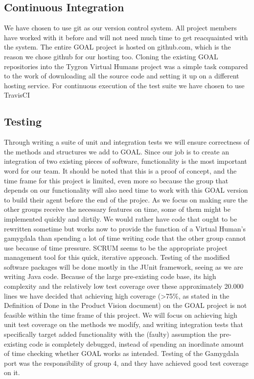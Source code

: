\documentclass[]{article}
\begin{document}
\subsection{Continuous Integration}
We have chosen to use git as our version control system. All project members have worked with it before and will not need much time to get reacquainted with the system. The entire GOAL project is hosted on \gls{github.com}, which is the reason we chose github for our hosting too. Cloning the existing GOAL repositories into the Tygron Virtual Humans project was a simple task compared to the work of downloading all the source code and setting it up on a different hosting service.
For continuous execution of the test suite we have chosen to use TravisCI

\subsection{Testing}
Through writing a suite of unit and integration tests we will ensure correctness of the methods and structures we add to GOAL. Since our job is to create an integration of two existing pieces of software, functionality is the most important word for our team. It should be noted that this is a proof of concept, and the time frame for this project is limited, even more so because the group that depends on our functionality will also need time to work with this GOAL version to build their agent before the end of the projec. As we focus on making sure the other groups receive the necessary features on time, some of them might be implemented quickly and dirtily. We would rather have code that ought to be rewritten sometime but works now to provide the function of a Virtual Human's gamygdala than spending a lot of time writing code that the other group cannot use because of time pressure. SCRUM seems to be the appropriate project management tool for this quick, iterative approach.
Testing of the modified software packages will be done mostly in the \gls{JUnit} framework, seeing as we are writing Java code. Because of the large pre-existing code base, its high complexity and the relatively low test coverage over these approximately 20.000 lines we have decided that achieving high coverage (>75\%, as stated in the Definition of Done in the Product Vision document) on the GOAL project is not feasible within the time frame of this project. We will focus on achieving high unit test coverage on the methods we modify, and writing integration tests that specifically target added functionality with the (faulty) assumption the pre-existing code is completely debugged, instead of spending an inordinate amount of time checking whether GOAL works as intended. Testing of the Gamygdala port was the responsibility of group 4, and they have achieved good test coverage on it. 
\end{document}
